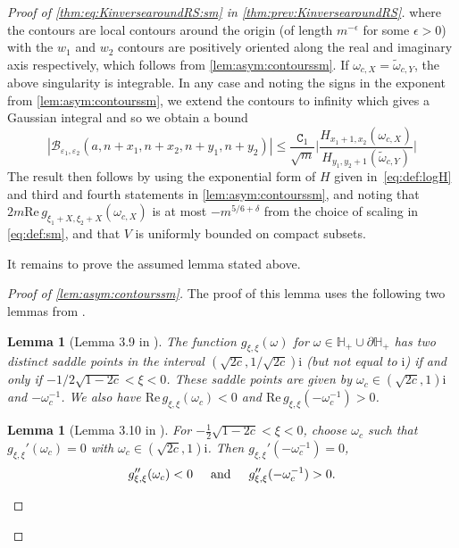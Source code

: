 \documentclass[11pt,twoside]{amsart}
\theoremstyle{plain}
\newtheorem{lem}[thm]{Lemma}
\numberwithin{quest}{section}
\theoremstyle{remark}
\numberwithin{rem}{section}
\theoremstyle{definition}
\newcommand{\eps}{\varepsilon}
\begin{document}
\begin{proof}[Proof of \eqref{thm:eq:KinversearoundRS:sm} in
		\cref{thm:prev:KinversearoundRS}]
		where the contours are local contours around the origin (of length $m^{-\epsilon}$ for some $\epsilon>0$) with the $w_1$ and $w_2$ contours are positively oriented along the real and imaginary axis respectively, which follows from \cref{lem:asym:contourssm}. If $\omega_{c,X}=\tilde{\omega}_{c,Y}$, the above singularity is integrable. In any case and noting the signs in the exponent from \cref{lem:asym:contourssm}, we extend the contours to infinity which gives a Gaussian integral and so we obtain a bound
		\begin{equation*}
			|\mathcal{B}_{\eps_1,\eps_2}(a,n+x_1,n+x_2,n+y_1,n+y_2)| \leq \frac{\mathtt{C}_1}{\sqrt{m}} \bigg| \frac{H_{x_1+1,x_2}(\omega_{c,X})}{H_{y_1,y_2+1}(\tilde{\omega}_{c,Y})} \bigg|
		\end{equation*}
		The result then follows by using the exponential form of $H$ given in~\eqref{eq:def:logH} and third and fourth statements in \cref{lem:asym:contourssm}, and noting that $2m\mathrm{Re}\,g_{\xi_1+X,\xi_2+X}(\omega_{c,X})$ is at most $-m^{5/6+\delta}$ from the choice of scaling in \eqref{eq:def:sm}, and that $V$ is uniformly bounded on compact subsets. 
        
		
		It remains to prove the assumed lemma stated above. 
		\begin{proof}[Proof of \cref{lem:asym:contourssm}]
			The proof of this lemma uses the following two lemmas from \cite{CJ16}.
			\begin{lem}[Lemma 3.9 in \cite{CJ16}]
            \label{lem:zeroes}
				The function $g_{\xi,\xi}(\omega)$ for $\omega \in \mathbb{H}_+ \cup \partial \mathbb{H}_+$ has two distinct saddle points in the interval $(\sqrt{2c},1/\sqrt{2c})\mathrm{i}$ (but not equal to $\mathrm{i}$) if and only if $-1/2 \sqrt{1-2c}<\xi<0$. These saddle points are given by $\omega_c \in (\sqrt{2c},1)\mathrm{i}$ and $-\omega_c^{-1}$. We also have $\mathrm{Re}\, g_{\xi,\xi}(\omega_c)<0$ and $\mathrm{Re}\, g_{\xi,\xi}(-\omega_c^{-1})>0$. 
			\end{lem}
			\begin{lem}[Lemma 3.10 in \cite{CJ16}]\label{lem:lem310inCJ16}
				For $-\frac{1}{2} \sqrt{1-2c} < \xi <0$, choose $\omega_c$ such that $g_{\xi,\xi}'(\omega_c)=0$ with $\omega_c \in (\sqrt{2c},1)\mathrm{i}$. Then $g_{\xi,\xi}'(-\omega_c^{-1})=0$,
				\begin{equation*}
					g_{\xi,\xi}''(\omega_c)<0 \hspace{5mm}\mbox{and} \hspace{5mm} g_{\xi,\xi}''(-\omega_c^{-1})>0.
				\end{equation*}
			\end{lem}


\end{proof}
\end{proof}
\end{document}
